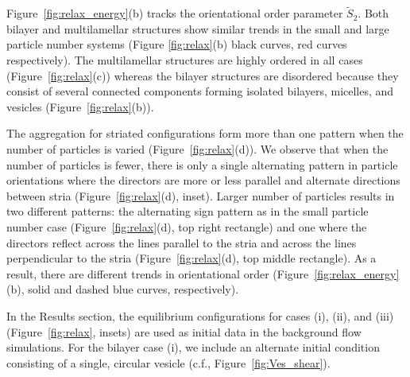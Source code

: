 \documentclass[aps,prl,preprint,groupedaddress]{revtex4-2}
\begin{document}
Figure~\ref{fig:relax_energy}(b) 
tracks the orientational order parameter $\tilde{S}_2$.
Both bilayer and multilamellar
structures show similar trends in the small and large particle number systems
(Figure \ref{fig:relax}(b) black curves, red curves respectively).
The multilamellar structures are highly ordered in all cases (Figure~\ref{fig:relax}(c))
whereas the bilayer structures
are disordered because they consist of several connected
components forming isolated bilayers, micelles, and vesicles (Figure~\ref{fig:relax}(b)).


The aggregation for striated configurations form more than one 
pattern when the number of particles is varied (Figure~\ref{fig:relax}(d)).
We observe that when the number of particles is fewer, there is only
a single alternating pattern in particle orientations where the directors
are more or less parallel and alternate directions between stria (Figure~\ref{fig:relax}(d), inset).
Larger number of particles results in two different patterns: the alternating sign pattern
as in the small particle number case (Figure~\ref{fig:relax}(d), 
top right rectangle) and one where the directors reflect across the lines parallel
to the stria and across the lines perpendicular to the stria (Figure~\ref{fig:relax}(d),
top middle rectangle).
As a result, there are different trends in orientational order
(Figure~\ref{fig:relax_energy}(b), solid and dashed blue curves, respectively).


In the Results section,
the equilibrium configurations for cases (i), (ii), and (iii)
(Figure~\ref{fig:relax}, insets) are
used as initial data in the
background flow simulations. 
For the bilayer case (i), we include an alternate initial condition 
consisting of a single, circular vesicle (c.f., Figure~\ref{fig:Ves_shear}).


\end{document}
